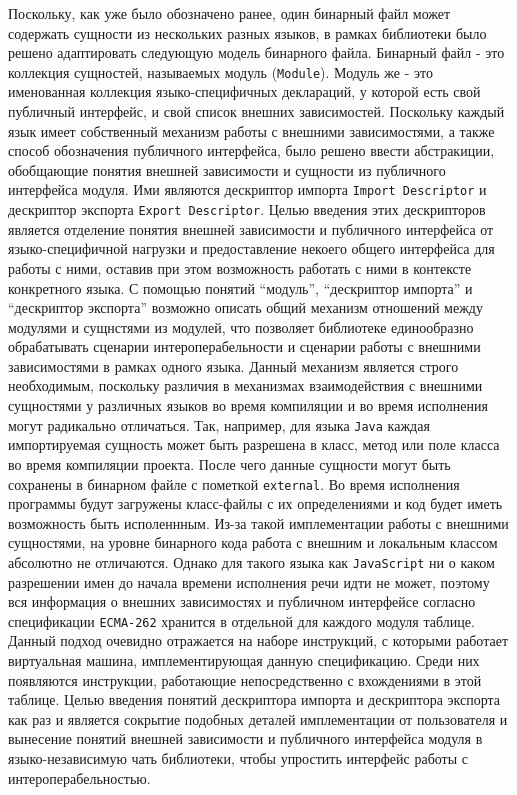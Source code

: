 Поскольку, как уже было обозначено ранее, один бинарный файл может содержать сущности из нескольких разных языков, в рамках библиотеки было решено адаптировать следующую модель бинарного файла. Бинарный файл - это коллекция сущностей, называемых модуль (\texttt{Module}). Модуль же - это именованная коллекция языко-специфичных деклараций, у которой есть свой публичный интерфейс, и свой список внешних зависимостей. Поскольку каждый язык имеет собственный механизм работы с внешними зависимостями, а также способ обозначения публичного интерфейса, было решено ввести абстракиции, обобщающие понятия внешней зависимости и сущности из публичного интерфейса модуля. Ими являются дескриптор импорта \texttt{Import~Descriptor} и дескриптор экспорта \texttt{Export~Descriptor}. Целью введения этих дескрипторов является отделение понятия внешней зависимости и публичного интерфейса от языко-специфичной нагрузки и предоставление некоего общего интерфейса для работы с ними, оставив при этом возможность работать с ними в контексте конкретного языка. С помощью понятий ``модуль'', ``дескриптор импорта'' и ``дескриптор экспорта'' возможно описать общий механизм отношений между модулями и сущнстями из модулей, что позволяет библиотеке единообразно обрабатывать сценарии интероперабельности и сценарии работы с внешними зависимостями в рамках одного языка. Данный механизм является строго необходимым, поскольку различия в механизмах взаимодействия с внешними сущностями у различных языков во время компиляции и во время исполнения могут радикально отличаться. Так, например, для языка \texttt{Java} каждая импортируемая сущность может быть разрешена в класс, метод или поле класса во время компиляции проекта. После чего данные сущности могут быть сохранены в бинарном файле с пометкой \texttt{external}. Во время исполнения программы будут загружены класс-файлы с их определениями и код будет иметь возможность быть исполеннным. Из-за такой имплементации работы с внешними сущностями, на уровне бинарного кода работа с внешним и локальным классом абсолютно не отличаются. Однако для такого языка как \texttt{JavaScript} ни о каком разрешении имен до начала времени исполнения речи идти не может, поэтому вся информация о внешних зависимостях и публичном интерфейсе согласно спецификации \texttt{ECMA-262} хранится в отдельной для каждого модуля таблице. Данный подход очевидно отражается на наборе инструкций, с которыми работает виртуальная машина, имплементирующая данную спецификацию. Среди них появляются инструкции, работающие непосредственно с вхождениями в этой таблице. Целью введения понятий дескриптора импорта и дескриптора экспорта как раз и является сокрытие подобных деталей имплементации от пользователя и вынесение понятий внешней зависимости и публичного интерфейса модуля в языко-независимую чать библиотеки, чтобы упростить интерфейс работы с интероперабельностью.


